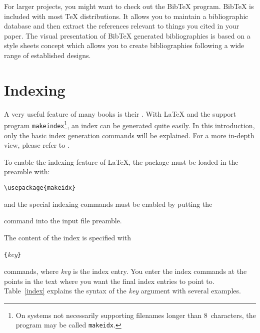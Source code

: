 \thispagestyle{fancyplain}

For larger projects, you might want to check out the Bib\TeX{}
program. Bib\TeX{} is included with most \TeX{} distributions. It
allows you to maintain a bibliographic database and then extract the
references relevant to things you cited in your paper. The visual
presentation of Bib\TeX{} generated bibliographies is based on a style
sheets concept which allows you to create bibliographies following
a wide range of established designs.

\section{Indexing} \label{sec:indexing}
A very useful feature of many books is their . With \LaTeX{}
and the support program \texttt{makeindex}\footnote{On systems not
  necessarily supporting
  filenames longer than 8~characters, the program may be called
  \texttt{makeidx}.}, an index can be generated quite easily.  In this
introduction, only the basic index generation commands will be explained.
For a more in-depth view, please refer to \companion.   

To enable the indexing feature of \LaTeX{}, the  package
must be loaded in the preamble with:
\begin{lscommand}
\verb|\usepackage{makeidx}|
\end{lscommand}
\noindent and the special indexing commands must be enabled by putting 
the
\begin{lscommand}
\end{lscommand}
\noindent command into the input file preamble.

The content of the index is specified with
\begin{lscommand}
  \verb|{|\emph{key}\verb|}|
\end{lscommand}
\noindent commands, where \emph{key} is the index entry. You enter the
index commands at the points in the text where you want the final index
entries to point to.  Table~\ref{index} explains the syntax of the
\emph{key} argument with several examples.

